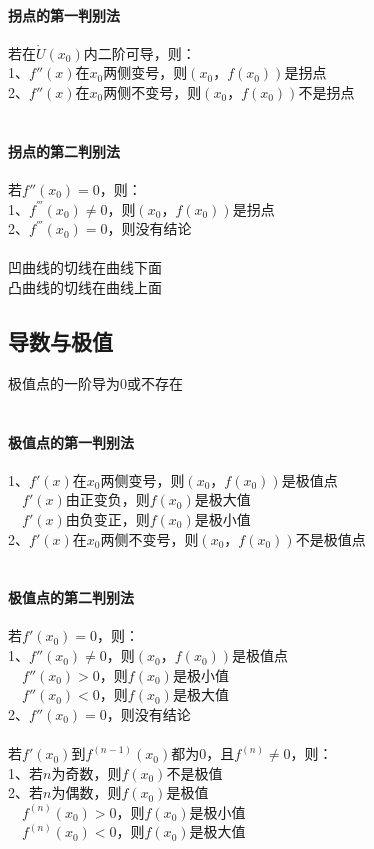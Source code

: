 \documentclass{article}
\begin{document}
\begin{flushleft}
	\paragraph{拐点的第一判别法}
	若在$\mathring{U}(x_0)$内二阶可导，则：\\
	1、$f''(x)$在$x_0$两侧变号，则$(x_0，f(x_0))$是拐点\\
	2、$f''(x)$在$x_0$两侧不变号，则$(x_0，f(x_0))$不是拐点\\
	~\\
	\paragraph{拐点的第二判别法}
	若$f''(x_0)=0$，则：\\
	1、$f^{'''}(x_0)\neq 0$，则$(x_0，f(x_0))$是拐点\\
	2、$f^{'''}(x_0)=0$，则没有结论\\
	~\\
	凹曲线的切线在曲线下面\\
	凸曲线的切线在曲线上面\\
	
	\subsection{导数与极值}
	
	极值点的一阶导为0或不存在\\
	~\\
	\paragraph{极值点的第一判别法}
	1、$f'(x)$在$x_0$两侧变号，则$(x_0，f(x_0))$是极值点\\
	\ \ $f'(x)$由正变负，则$f(x_0)$是极大值\\
	\ \ $f'(x)$由负变正，则$f(x_0)$是极小值\\
	2、$f'(x)$在$x_0$两侧不变号，则$(x_0，f(x_0))$不是极值点\\
	~\\
	\paragraph{极值点的第二判别法}
	若$f'(x_0)=0$，则：\\
	1、$f''(x_0)\neq 0$，则$(x_0，f(x_0))$是极值点\\
	\ \ $f''(x_0)>0$，则$f(x_0)$是极小值\\
	\ \ $f''(x_0)<0$，则$f(x_0)$是极大值\\
	2、$f''(x_0)=0$，则没有结论\\
	~\\
	若$f'(x_0)$到$f^{(n-1)}(x_0)$都为0，且$f^{(n)}\neq 0$，则：\\
	1、若$n$为奇数，则$f(x_0)$不是极值\\
	2、若$n$为偶数，则$f(x_0)$是极值\\
	\ \ $f^{(n)}(x_0)>0$，则$f(x_0)$是极小值\\
	\ \ $f^{(n)}(x_0)<0$，则$f(x_0)$是极大值\\
	

\end{flushleft}
\end{document}
